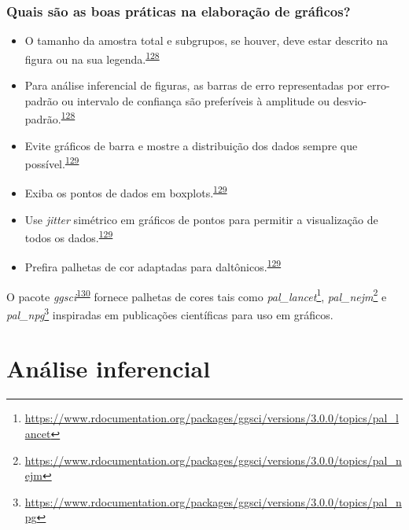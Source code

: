 \documentclass[
]{book}
\renewcommand{\href}[2]{#2\footnote{\url{#1}}}
\newenvironment{infobox}[1]
  {
  \begin{itemize}
  \renewcommand{\labelitemi}{
    \raisebox{-.7\height}[0pt][0pt]{
      {\setkeys{Gin}{width=3em,keepaspectratio}
        \texttt{[image: \#1]}}
    }
  }
  \setlength{\fboxsep}{1em}
  \begin{blackbox}
  \item
  }
  {
  \end{blackbox}
  \end{itemize}
  }
\begin{document}
\hypertarget{quais-suxe3o-as-boas-pruxe1ticas-na-elaborauxe7uxe3o-de-gruxe1ficos}{%
\subsection{Quais são as boas práticas na elaboração de gráficos?}\label{quais-suxe3o-as-boas-pruxe1ticas-na-elaborauxe7uxe3o-de-gruxe1ficos}}

\begin{itemize}
\item
  O tamanho da amostra total e subgrupos, se houver, deve estar descrito na figura ou na sua legenda.\textsuperscript{\protect\hyperlink{ref-Cumming2007}{128}}
\item
  Para análise inferencial de figuras, as barras de erro representadas por erro-padrão ou intervalo de confiança são preferíveis à amplitude ou desvio-padrão.\textsuperscript{\protect\hyperlink{ref-Cumming2007}{128}}
\item
  Evite gráficos de barra e mostre a distribuição dos dados sempre que possível.\textsuperscript{\protect\hyperlink{ref-Weissgerber2019}{129}}
\item
  Exiba os pontos de dados em boxplots.\textsuperscript{\protect\hyperlink{ref-Weissgerber2019}{129}}
\item
  Use \emph{jitter} simétrico em gráficos de pontos para permitir a visualização de todos os dados.\textsuperscript{\protect\hyperlink{ref-Weissgerber2019}{129}}
\item
  Prefira palhetas de cor adaptadas para daltônicos.\textsuperscript{\protect\hyperlink{ref-Weissgerber2019}{129}}
\end{itemize}

\begin{infobox}{images/Rlogo}
O pacote \emph{ggsci}\textsuperscript{\protect\hyperlink{ref-ggsci}{130}} fornece palhetas de cores tais como \href{https://www.rdocumentation.org/packages/ggsci/versions/3.0.0/topics/pal_lancet}{\emph{pal\_lancet}}, \href{https://www.rdocumentation.org/packages/ggsci/versions/3.0.0/topics/pal_nejm}{\emph{pal\_nejm}} e \href{https://www.rdocumentation.org/packages/ggsci/versions/3.0.0/topics/pal_npg}{\emph{pal\_npg}} inspiradas em publicações científicas para uso em gráficos.

\end{infobox}

\hypertarget{analise-inferencial}{%
\chapter{\texorpdfstring{\textbf{Análise inferencial}}{Análise inferencial}}\label{analise-inferencial}}
\end{document}
